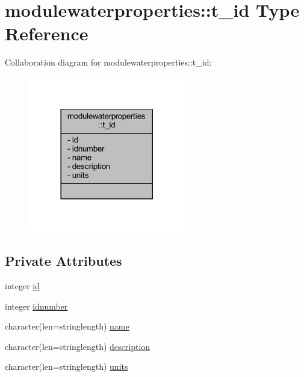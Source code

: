 \hypertarget{structmodulewaterproperties_1_1t__id}{}\section{modulewaterproperties\+:\+:t\+\_\+id Type Reference}
\label{structmodulewaterproperties_1_1t__id}


Collaboration diagram for modulewaterproperties\+:\+:t\+\_\+id\+:\nopagebreak
\begin{figure}[H]
\begin{center}
\leavevmode
\includegraphics[width=194pt]{structmodulewaterproperties_1_1t__id__coll__graph}
\end{center}
\end{figure}
\subsection*{Private Attributes}
\begin{DoxyCompactItemize}
\item 
integer \mbox{\hyperlink{structmodulewaterproperties_1_1t__id_a12fff6dcb530ba9c77a91ae31dc79bc4}{id}}
\item 
integer \mbox{\hyperlink{structmodulewaterproperties_1_1t__id_a1970a9a960dd16170f5414678abc5db5}{idnumber}}
\item 
character(len=stringlength) \mbox{\hyperlink{structmodulewaterproperties_1_1t__id_a108f6624d05aaf85e75c64584c690c7b}{name}}
\item 
character(len=stringlength) \mbox{\hyperlink{structmodulewaterproperties_1_1t__id_af8f6bd9e24fc57870a4df3435b955fc6}{description}}
\item 
character(len=stringlength) \mbox{\hyperlink{structmodulewaterproperties_1_1t__id_a3c3b1f53af0c15e101da0cfb3458e0b7}{units}}
\end{DoxyCompactItemize}


